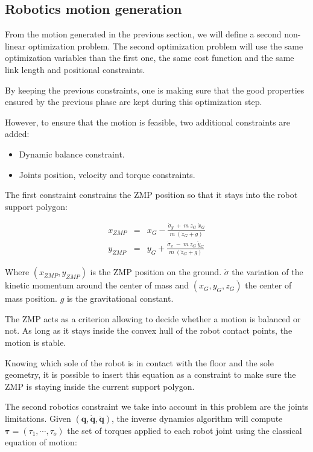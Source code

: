 \documentclass[letterpaper, 10 pt, conference]{ieeeconf}  %
\begin{document}
\subsection{Robotics motion generation}


From the motion generated in the previous section, we will define a
second non-linear optimization problem. The second optimization
problem will use the same optimization variables than the first one,
the same cost function and the same link length and positional
constraints.


By keeping the previous constraints, one is making sure that the good
properties ensured by the previous phase are kept during this
optimization step.


However, to ensure that the motion is feasible, two additional
constraints are added:
\begin{itemize}
\item Dynamic balance constraint.
\item Joints position, velocity and torque constraints.
\end{itemize}


The first constraint constrains the ZMP position so that it stays into
the robot support polygon:

\begin{equation}
  \begin{array}{ccc}
    x_{ZMP} &=& x_G - \frac{\dot{\sigma}_y\ +\ m\ z_G\ \ddot{x}_G}{m\ (\ddot{z}_G + g)} \\
    y_{ZMP} &=& y_G + \frac{\dot{\sigma}_x\ -\ m\ z_G\ \ddot{y}_G}{m\ (\ddot{z}_G + g)}
    \end{array}
\end{equation}

Where $(x_{ZMP}, y_{ZMP})$ is the ZMP position on the
ground. $\dot{\sigma}$ the variation of the kinetic momentum around
the center of mass and $(x_G, y_G, z_G)$ the center of mass
position. $g$ is the gravitational constant.

The ZMP acts as a criterion allowing to decide whether a motion is
balanced or not. As long as it stays inside the convex hull of the
robot contact points, the motion is stable.

Knowing which sole of the robot is in contact with the floor and the
sole geometry, it is possible to insert this equation as a constraint
to make sure the ZMP is staying inside the current support polygon.


The second robotics constraint we take into account in this problem
are the joints limitations. Given $(\mathbf{q}, \dot{\mathbf{q}},
\ddot{\mathbf{q}})$, the inverse dynamics algorithm \cite{FIXME} will
compute $\mathbf{\tau} = (\tau_1, \cdots, \tau_o)$ the set of torques
applied to each robot joint using the classical equation of motion:
\end{document}
